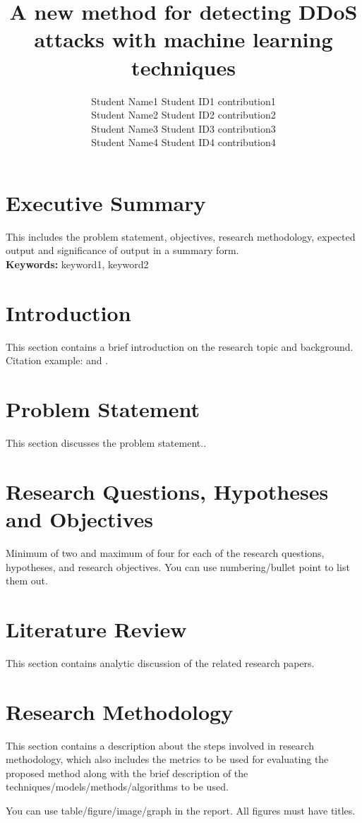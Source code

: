 \documentclass[a4paper, 12pt]{article}
\author{
Student Name1 \quad Student ID1 \quad contribution1 \\
Student Name2 \quad Student ID2 \quad contribution2\\
Student Name3 \quad Student ID3 \quad contribution3\\
Student Name4 \quad Student ID4 \quad contribution4\\
}
\title{ A new method for detecting DDoS attacks with machine learning techniques }
\begin{document}
\maketitle

\section*{Executive Summary}
This includes the problem statement, objectives, research methodology, expected output and significance of output in a summary form. 
\hfill
\\
\textbf{Keywords:} keyword1, keyword2 \\

\section{Introduction}
This section contains a brief introduction on the research topic and background. \\
Citation example: \cite{Termenchy15} and \cite{Jones19}.

\section{Problem Statement}
This section discusses the problem statement.. 

\section{Research Questions, Hypotheses and Objectives}
Minimum of two and maximum of four for each of the research questions, hypotheses, and research objectives. You can use numbering/bullet point to list them out.

\section{Literature Review}
This section contains analytic discussion of the related research papers. 

\section{Research Methodology}
This section contains a description about the steps involved in research methodology, which also includes the metrics to be used for evaluating the proposed method along with the brief description of the techniques/models/methods/algorithms to be used.

You can use table/figure/image/graph in the report. All figures must have titles.
\end{document}

